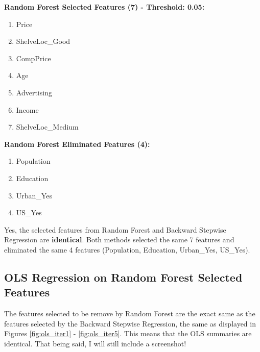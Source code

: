 \documentclass[12pt]{article}
\begin{document}
\noindent
\begin{minipage}[t]{0.48\textwidth}
    \textbf{Random Forest Selected Features (7) - Threshold: 0.05:}
    \begin{enumerate}
        \item Price
        \item ShelveLoc\_Good
        \item CompPrice
        \item Age
        \item Advertising
        \item Income
        \item ShelveLoc\_Medium
    \end{enumerate}
\end{minipage}
\hfill
\begin{minipage}[t]{0.48\textwidth}
    \textbf{Random Forest Eliminated Features (4):}
    \begin{enumerate}
        \item Population
        \item Education
        \item Urban\_Yes
        \item US\_Yes
    \end{enumerate}
\end{minipage}

\vspace{0.5cm}

Yes, the selected features from Random Forest and Backward Stepwise Regression are \textbf{identical}. Both methods selected the same 7 features and eliminated the same 4 features (Population, Education, Urban\_Yes, US\_Yes).

\subsection{OLS Regression on Random Forest Selected Features}

The features selected to be remove by Random Forest are the exact same as the features selected by the Backward Stepwise Regression, 
the same as displayed in Figures \ref{fig:ols_iter1} - \ref{fig:ols_iter5}. This means that the OLS summaries are identical. That being
said, I will still include a screenshot!
\end{document}
